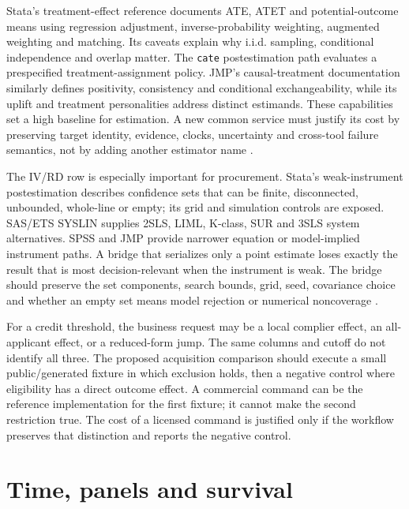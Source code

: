 Stata's treatment-effect reference documents ATE, ATET and potential-outcome
means using regression adjustment, inverse-probability weighting, augmented
weighting and matching. Its caveats explain why i.i.d. sampling, conditional
independence and overlap matter. The \texttt{cate} postestimation path
evaluates a prespecified treatment-assignment policy. JMP's causal-treatment
documentation similarly defines positivity, consistency and conditional
exchangeability, while its uplift and treatment personalities address distinct
estimands. These capabilities set a high baseline for estimation. A new common
service must justify its cost by preserving target identity, evidence, clocks,
uncertainty and cross-tool failure semantics, not by adding another estimator
name \citep{exec13_ch_stata,exec13_ch_jmp_causal,exec13_ch_jmp_uplift}.

The IV/RD row is especially important for procurement. Stata's weak-instrument
postestimation describes confidence sets that can be finite, disconnected,
unbounded, whole-line or empty; its grid and simulation controls are exposed.
SAS/ETS SYSLIN supplies 2SLS, LIML, K-class, SUR and 3SLS system alternatives.
SPSS and JMP provide narrower equation or model-implied instrument paths. A
bridge that serializes only a point estimate loses exactly the result that is
most decision-relevant when the instrument is weak. The bridge should preserve
the set components, search bounds, grid, seed, covariance choice and whether an
empty set means model rejection or numerical noncoverage
\citep{exec13_ivrd_stata,exec13_ivrd_sas}.

For a credit threshold, the business request may be a local complier effect,
an all-applicant effect, or a reduced-form jump. The same columns and cutoff do
not identify all three. The proposed acquisition comparison should execute a
small public/generated fixture in which exclusion holds, then a negative control
where eligibility has a direct outcome effect. A commercial command can be the
reference implementation for the first fixture; it cannot make the second
restriction true. The cost of a licensed command is justified only if the
workflow preserves that distinction and reports the negative control.

\section{Time, panels and survival}
\label{exec17:s8-temporal}

